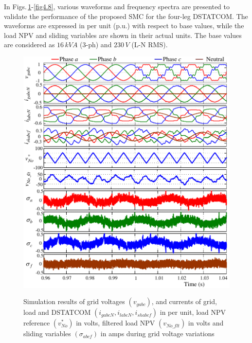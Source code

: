 In Figs.\,\ref{fig4.82}-\ref{fig4.8}, various waveforms and frequency spectra are presented to validate the performance of the proposed SMC for the four-leg DSTATCOM. The waveforms are expressed in per unit (p.u.) with respect to base values, while the load NPV and sliding variables are shown in their actual units. The base values are considered as $16\,\si{kVA}$ (3-ph) and $230\,\si{V}$ (L-N RMS).
\begin{figure}[h!]  
		\centering
		\includegraphics[scale=0.9]{figures/Chapter_4/Mine/SimRes1_new.pdf} \\
		\caption{Simulation results of grid voltages $(v_{gabc})$, and currents of grid, load and DSTATCOM $(i_{gabcN}, i_{labcN}, i_{shabcf})$ in per unit, load NPV reference $(v^{*}_{No})$ in volts, filtered load NPV $(v_{No\_flt})$ in volts and sliding variables $(\sigma_{abcf})$ in amps during grid voltage variations}
		\label{fig4.82}
\end{figure} 

